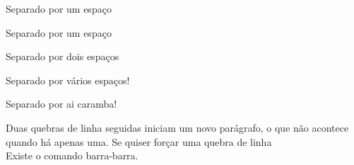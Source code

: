 Separado por
um espaço

Separado por um espaço

Separado por  dois espaços

Separado por        vários espaços!

Separado por 
                    ai caramba!

Duas quebras de linha seguidas
iniciam um novo parágrafo, o que não 
acontece quando há apenas uma.
Se quiser forçar uma quebra de linha\\
Existe o comando barra-barra.
